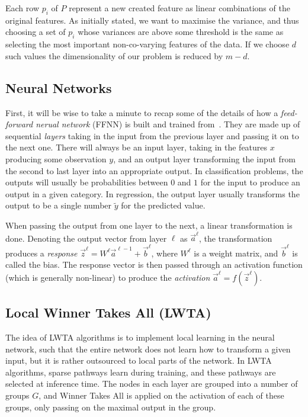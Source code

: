     Each row $p_i$ of $P$ represent a new created feature as linear combinations of the original features. As initially stated, we want to maximise the variance, and thus choosing a set of $p_i$ whose variances are above some threshold is the same as selecting the most important non-co-varying features of the data. If we choose $d$ such values the dimensionality of our problem is reduced by $m-d$.
    



     

\subsection{Neural Networks}
    First, it will be wise to take a minute to recap some of the details of how a \textit{feed-forward nerual network} (FFNN) is built and trained from~\cite{Project2}. They are made up of sequential \textit{layers} taking in the input from the previous layer and passing it on to the next one. There will always be an input layer, taking in the features $x$ producing some observation $y$, and an output layer transforming the input from the second to last layer into an appropriate output. In classification problems, the outputs will usually be probabilities between $0$ and $1$ for the input to produce an output in a given category. In regression, the output layer usually transforms the output to be a single number $\tilde{y}$ for the predicted value.

    When passing the output from one layer to the next, a linear transformation is done. Denoting the output vector from layer $\ell$ as $\vec{a}^\ell$, the transformation produces a \textit{response} $\vec{z}^{\ell} = W^\ell \vec{a}^{\ell-1} + \vec{b}^\ell$, where $W^\ell$ is a weight matrix, and $\vec{b}^\ell$ is called the bias. The response vector is then passed through an activation function (which is generally non-linear) to produce the \textit{activation} $\vec{a}^\ell = f(\vec{z}^\ell)$.

\subsection{Local Winner Takes All (LWTA)}
    The idea of LWTA algorithms is to implement local learning in the neural network, such that the entire network does not learn how to transform a given input, but it is rather outsourced to local parts of the network. In LWTA algorithms, sparse pathways learn during training, and these pathways are selected at inference time. The nodes in each layer are grouped into a number of groups $G$, and Winner Takes All is applied on the activation of each of these groups, only passing on the maximal output in the group.

